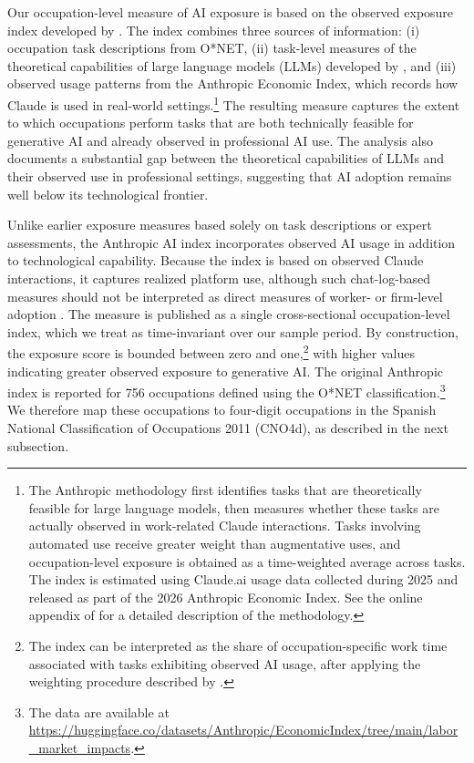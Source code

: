 \documentclass[11pt]{article}
\begin{document}
Our occupation-level measure of AI exposure is based on the observed exposure index developed by \citet{massenkoff_mccrory_2026}. The index combines three sources of information: (i) occupation task descriptions from O*NET, (ii) task-level measures of the theoretical capabilities of large language models (LLMs) developed by \citet{eloundou_manning_mishkin_rock_2024}, and (iii) observed usage patterns from the Anthropic Economic Index, which records how Claude is used in real-world settings.\footnote{The Anthropic methodology first identifies tasks that are theoretically feasible for large language models, then measures whether these tasks are actually observed in work-related Claude interactions. Tasks involving automated use receive greater weight than augmentative uses, and occupation-level exposure is obtained as a time-weighted average across tasks. The index is estimated using Claude.ai usage data collected during 2025 and released as part of the 2026 Anthropic Economic Index. See the online appendix of \citet{massenkoff_mccrory_2026} for a detailed description of the methodology.} The resulting measure captures the extent to which occupations perform tasks that are both technically feasible for generative AI and already observed in professional AI use. The analysis also documents a substantial gap between the theoretical capabilities of LLMs and their observed use in professional settings, suggesting that AI adoption remains well below its technological frontier.

Unlike earlier exposure measures based solely on task descriptions or expert assessments, the Anthropic AI index incorporates observed AI usage in addition to technological capability. Because the index is based on observed Claude interactions, it captures realized platform use, although such chat-log-based measures should not be interpreted as direct measures of worker- or firm-level adoption \citep{bick_et_al_2026}. The measure is published as a single cross-sectional occupation-level index, which we treat as time-invariant over our sample period. By construction, the exposure score is bounded between zero and one,\footnote{The index can be interpreted as the share of occupation-specific work time associated with tasks exhibiting observed AI usage, after applying the weighting procedure described by \citet{massenkoff_mccrory_2026}.} with higher values indicating greater observed exposure to generative AI. The original Anthropic index is reported for 756 occupations defined using the O*NET classification.\footnote{The data are available at \url{https://huggingface.co/datasets/Anthropic/EconomicIndex/tree/main/labor_market_impacts}.} We therefore map these occupations to four-digit occupations in the Spanish National Classification of Occupations 2011 (CNO4d), as described in the next subsection.
\end{document}
